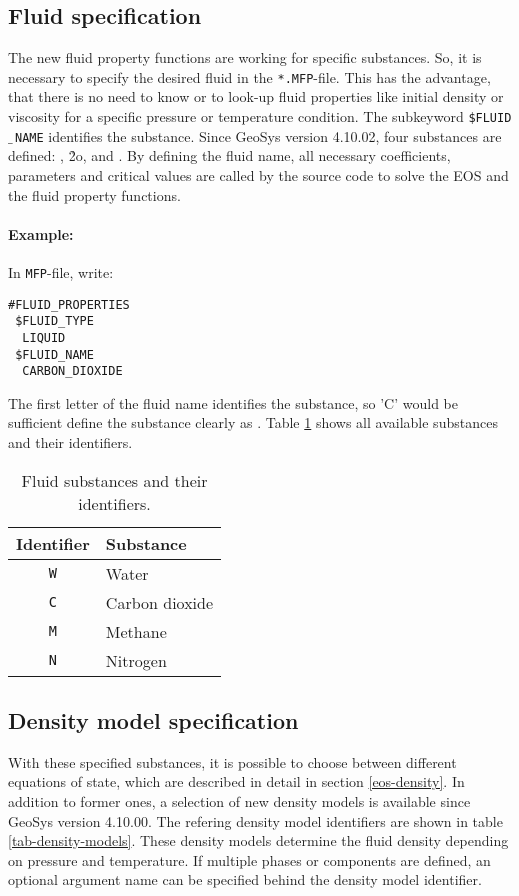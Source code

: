 \subsection{Fluid specification}\label{sec-fluid-name}
The new fluid property functions are working for specific substances. So, it is necessary to specify the desired fluid in the \texttt{*.MFP}-file. This has the advantage, that there is no need to know or to look-up fluid properties like initial density or viscosity for a specific pressure or temperature condition. The subkeyword \texttt{\$FLUID$\_\,$NAME} identifies the substance. Since GeoSys version 4.10.02, four substances are defined: , \h2o,  and . By defining the fluid name, all necessary coefficients, parameters and critical values are called by the source code to solve the EOS and the fluid property functions. 
\paragraph{Example:}
In \texttt{MFP}-file, write:
\begin{verbatim}
#FLUID_PROPERTIES
 $FLUID_TYPE
  LIQUID
 $FLUID_NAME
  CARBON_DIOXIDE
\end{verbatim}
The first letter of the fluid name identifies the substance, so 'C' would be sufficient define the substance clearly as . Table \ref{tab-fluid_name_spec} shows all available substances and their identifiers. 


\begin{table}[ht]
\caption{Fluid substances and their identifiers.}
\begin{center}
\begin{tabular}{cl}
\toprule
Identifier & Substance \\
\midrule
\texttt{W} & Water \\
\texttt{C} & Carbon dioxide \\
\texttt{M} & Methane \\
\texttt{N} & Nitrogen\\
\bottomrule
\end{tabular}
\end{center}
\label{tab-fluid_name_spec}
\end{table}


\subsection{Density model specification}

With these specified substances, it is possible to choose between different equations of state, which are described in detail in section \ref{eos-density}. In addition to former ones, a selection of new density models is available since GeoSys version 4.10.00. The refering density model identifiers are shown in table \ref{tab-density-models}. These density models determine the fluid density depending on pressure and temperature. If multiple phases or components are defined, an optional argument name can be specified behind the density model identifier.

